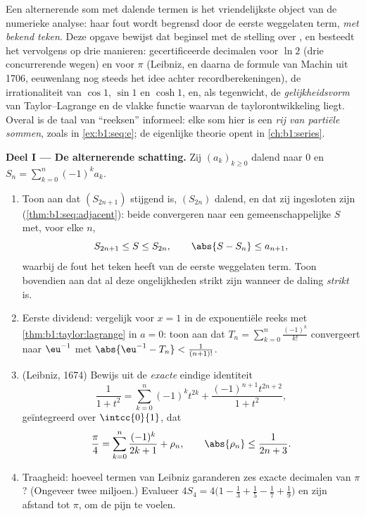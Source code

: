 \begin{problem}
\label{pb:b1:taylor:1}
Een alternerende som met dalende termen is het vriendelijkste
object van de numerieke analyse: haar fout wordt begrensd door de
eerste weggelaten term, \emph{met bekend teken}. Deze opgave
bewijst dat beginsel met de stelling over , en
besteedt het vervolgens op drie manieren: gecertificeerde
decimalen voor $\ln 2$ (drie concurrerende wegen) en voor $\pi$
(Leibniz, en daarna de formule van Machin uit 1706, eeuwenlang nog
steeds het idee achter recordberekeningen), de irrationaliteit van
$\cos 1$, $\sin 1$ en $\cosh 1$, en, als tegenwicht, de
\emph{gelijkheidsvorm} van Taylor--Lagrange en de vlakke functie
waarvan de taylorontwikkeling liegt. Overal is de
taal van ``reeksen'' informeel: elke som hier is een \emph{rij van
partiële sommen}, zoals in \cref{ex:b1:seq:e}; de eigenlijke
theorie opent in \cref{ch:b1:series}.

\medskip
\noindent\textbf{Deel I --- De alternerende schatting.} Zij
$(a_k)_{k \geq 0}$ dalend naar $0$ en $S_n = \sum_{k=0}^{n}
(-1)^k a_k$.
\begin{enumerate}
  \item Toon aan dat $(S_{2n+1})$ stijgend is, $(S_{2n})$ dalend,
        en dat zij ingesloten zijn
        (\cref{thm:b1:seq:adjacent}): beide convergeren naar een
        gemeenschappelijke $S$ met, voor elke $n$,
        \[
        S_{2n+1} \leq S \leq S_{2n},
        \qquad
        \abs{S - S_n} \leq a_{n+1} ,
        \]
        waarbij de fout het teken heeft van de eerste weggelaten
        term. Toon bovendien aan dat al deze ongelijkheden strikt
        zijn wanneer de daling \emph{strikt} is.
  \item Eerste dividend: vergelijk voor $x = 1$ in de
        exponentiële reeks met \cref{thm:b1:taylor:lagrange} in $a
        = 0$: toon aan dat $T_n = \sum_{k=0}^{n}
        \frac{(-1)^k}{k!}$ convergeert naar $\eu^{-1}$ met
        $\abs{\eu^{-1} - T_n} < \frac{1}{(n+1)!}$.
  \item (Leibniz, 1674) Bewijs uit de \emph{exacte} eindige
        identiteit
        \[
        \frac{1}{1 + t^2} = \sum_{k=0}^{n} (-1)^k t^{2k}
        + \frac{(-1)^{n+1} t^{2n+2}}{1 + t^2} ,
        \]
        geïntegreerd over $\intcc{0}{1}$, dat
        \[
        \frac\pi4 = \sum_{k=0}^{n} \frac{(-1)^k}{2k+1} + \rho_n,
        \qquad \abs{\rho_n} \leq \frac{1}{2n+3} .
        \]
  \item Traagheid: hoeveel termen van Leibniz garanderen zes
        exacte decimalen van $\pi$? (Ongeveer twee miljoen.)
        Evalueer $4 S_4 = 4\bigl(1 - \frac13 + \frac15 - \frac17 +
        \frac19\bigr)$ en zijn afstand tot $\pi$, om de pijn te
        voelen.
\end{enumerate}


\end{problem}
